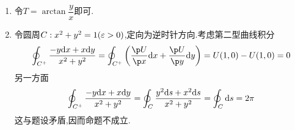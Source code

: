 \documentclass{ctexart}
\begin{document}
\begin{solution}
    \begin{enumerate}[label=\tbf{(\arabic*)}]
        \item 令$T=\arctan\dfrac yx$即可.
        \item 令圆周$C:x^2+y^2=1(\varepsilon>0)$,定向为逆时针方向.考虑第二型曲线积分
            \[\oint_{C^+}\dfrac{-y\dx+x\di y}{x^2+y^2}=\oint_{C^+}\left(\dfrac{\p U}{\p x}\dx+\dfrac{\p U}{\p y}\di y\right)=U(1,0)-U(1,0)=0\]
            另一方面
            \[\oint_{C^+}\dfrac{-y\mathrm{d} x+x\mathrm{d} y}{x^2+y^2}=\oint_{C}\dfrac{y^2\mathrm{d} s+x^2\mathrm{d} s}{x^2+y^2}=\oint_{C}\mathrm{d} s=2\pi\]
            这与题设矛盾,因而命题不成立.
    \end{enumerate}
\end{solution}
\end{document}
